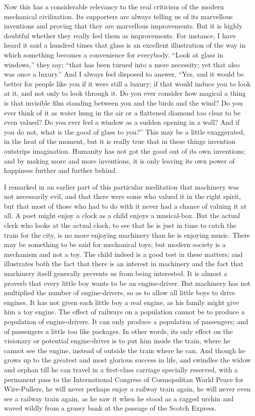 \documentclass{book}
\begin{document}
Now this has a considerable relevancy to the real criticism of the modern mechanical civilization. Its supporters are always telling us of its marvellous inventions and proving that they are marvellous improvements. But it is highly doubtful whether they really feel them as improvements. For instance, I have heard it said a hundred times that glass is an excellent illustration of the way in which something becomes a convenience for everybody. “Look at glass in windows,” they say; “that has been turned into a mere necessity; yet that also was once a luxury.” And I always feel disposed to answer, “Yes, and it would be better for people like you if it were still a luxury; if that would induce you to look at it, and not only to look through it. Do you ever consider how magical a thing is that invisible film standing between you and the birds and the wind? Do you ever think of it as water hung in the air or a flattened diamond too clear to be even valued? Do you ever feel a window as a sudden opening in a wall? And if you do not, what is the good of glass to you?” This may be a little exaggerated, in the heat of the moment, but it is really true that in these things invention outstrips imagination. Humanity has not got the good out of its own inventions; and by making more and more inventions, it is only leaving its own power of happiness further and further behind.

I remarked in an earlier part of this particular meditation that machinery was not necessarily evil, and that there were some who valued it in the right spirit, but that most of those who had to do with it never had a chance of valuing it at all. A poet might enjoy a clock as a child enjoys a musical-box. But the actual clerk who looks at the actual clock, to see that he is just in time to catch the train for the city, is no more enjoying machinery than he is enjoying music. There may be something to be said for mechanical toys; but modern society is a mechanism and not a toy. The child indeed is a good test in these matters; and illustrates both the fact that there is an interest in machinery and the fact that machinery itself generally prevents us from being interested. It is almost a proverb that every little boy wants to be an engine-driver. But machinery has not multiplied the number of engine-drivers, so as to allow all little boys to drive engines. It has not given each little boy a real engine, as his family might give him a toy engine. The effect of railways on a population cannot be to produce a population of engine-drivers. It can only produce a population of passengers; and of passengers a little too like packages. In other words, its only effect on the visionary or potential engine-driver is to put him inside the train, where he cannot see the engine, instead of outside the train where he can. And though he grows up to the greatest and most glorious success in life, and swindles the widow and orphan till he can travel in a first-class carriage specially reserved, with a permanent pass to the International Congress of Cosmopolitan World Peace for Wire-Pullers, he will never perhaps enjoy a railway train again, he will never even see a railway train again, as he saw it when he stood as a ragged urchin and waved wildly from a grassy bank at the passage of the Scotch Express.
\end{document}
